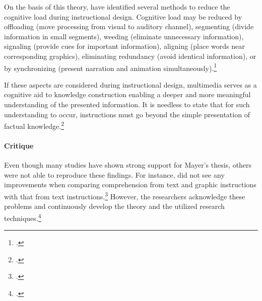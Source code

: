 On the basis of this theory, \cite{MayerNineWaysReduce2003} have identified several methods to reduce the cognitive load during instructional design. Cognitive load may be reduced by offloading (move processing from visual to auditory channel), segmenting (divide information in small segments), weeding (eliminate unnecessary information), signaling (provide cues for important information), aligning (place words near corresponding graphics), eliminating redundancy (avoid identical information), or by synchronizing (present narration and animation simultaneously).\footcites[Cf.][p.46]{MayerNineWaysReduce2003}

If these aspects are considered during instructional design, multimedia serves as a cognitive aid to knowledge construction enabling a deeper and more meaningful understanding of the presented information. It is needless to state that for such understanding to occur, instructions must go beyond the simple presentation of factual knowledge.\footcites[Cf.][p.229]{MayerRotemeaningfullearning2002}

\paragraph{Critique} Even though many studies have shown strong support for Mayer's thesis, others were not able to reproduce these findings. For instance, \cite{RaschInteractivenoninteractivepictures2009} did not see any improvements when comparing comprehension from text and graphic instructions with that from text instructions.\footcites[Cf.][]{RaschInteractivenoninteractivepictures2009} However, the researchers acknowledge these problems and continuously develop the theory and the utilized research techniques.\footcites[Cf.][p.52]{SordenCognitiveTheoryMultimedia} 

